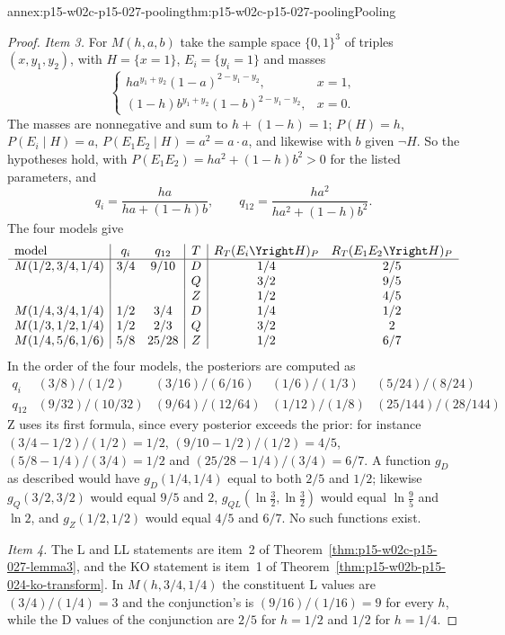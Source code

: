 \begin{annexitem}{annex:p15-w02c-p15-027-pooling}{thm:p15-w02c-p15-027-pooling}{Pooling}
\begin{proof}
\emph{Item 3.} For \(M(h,a,b)\) take the sample space \(\{0,1\}^3\)
of triples \((x,y_1,y_2)\), with \(H=\{x=1\}\),
\(E_i=\{y_i=1\}\) and masses
\[
 \begin{cases}
  ha^{y_1+y_2}(1-a)^{2-y_1-y_2}, & x=1,\\
  (1-h)b^{y_1+y_2}(1-b)^{2-y_1-y_2}, & x=0.
 \end{cases}
\]
The masses are nonnegative and sum to \(h+(1-h)=1\); \(P(H)=h\),
\(P(E_i\mid H)=a\), \(P(E_1E_2\mid H)=a^2=a\cdot a\), and likewise with
\(b\) given \(\neg H\). So the hypotheses hold, with
\(P(E_1E_2)=ha^2+(1-h)b^2>0\) for the listed parameters, and
\[
 q_i=\frac{ha}{ha+(1-h)b},\qquad q_{12}=\frac{ha^2}{ha^2+(1-h)b^2}.
\]
The four models give
\[
\begin{array}{l|cc|c|cc}
 \text{model} & q_i & q_{12} & T & R_T(E_i\Yright H)_P
   & R_T(E_1E_2\Yright H)_P\\\hline
 M(1/2,3/4,1/4) & 3/4 & 9/10 & D & 1/4 & 2/5\\
 & & & Q & 3/2 & 9/5\\
 & & & Z & 1/2 & 4/5\\
 M(1/4,3/4,1/4) & 1/2 & 3/4 & D & 1/4 & 1/2\\
 M(1/3,1/2,1/4) & 1/2 & 2/3 & Q & 3/2 & 2\\
 M(1/4,5/6,1/6) & 5/8 & 25/28 & Z & 1/2 & 6/7
\end{array}
\]
In the order of the four models, the posteriors are computed as
\[
\begin{array}{l|cccc}
 q_i & (3/8)/(1/2) & (3/16)/(6/16) & (1/6)/(1/3) & (5/24)/(8/24)\\
 q_{12} & (9/32)/(10/32) & (9/64)/(12/64) & (1/12)/(1/8)
   & (25/144)/(28/144)
\end{array}
\]
Z uses its first
formula, since every posterior exceeds the prior: for instance
\((3/4-1/2)/(1/2)=1/2\), \((9/10-1/2)/(1/2)=4/5\),
\((5/8-1/4)/(3/4)=1/2\) and \((25/28-1/4)/(3/4)=6/7\). A function \(g_D\) as described would have \(g_D(1/4,1/4)\)
equal to both \(2/5\) and \(1/2\); likewise \(g_Q(3/2,3/2)\) would equal
\(9/5\) and \(2\), \(g_{QL}(\ln\tfrac32,\ln\tfrac32)\) would equal
\(\ln\tfrac95\) and \(\ln2\), and \(g_Z(1/2,1/2)\) would equal \(4/5\)
and \(6/7\). No such functions exist.

\emph{Item 4.} The L and LL statements are item~2 of
Theorem~\ref{thm:p15-w02c-p15-027-lemma3}, and the KO statement is
item~1 of Theorem~\ref{thm:p15-w02b-p15-024-ko-transform}. In
\(M(h,3/4,1/4)\) the constituent L values are \((3/4)/(1/4)=3\) and the
conjunction's is \((9/16)/(1/16)=9\) for every \(h\), while the D values
of the conjunction are \(2/5\) for \(h=1/2\) and \(1/2\) for \(h=1/4\).
\end{proof}
\end{annexitem}

